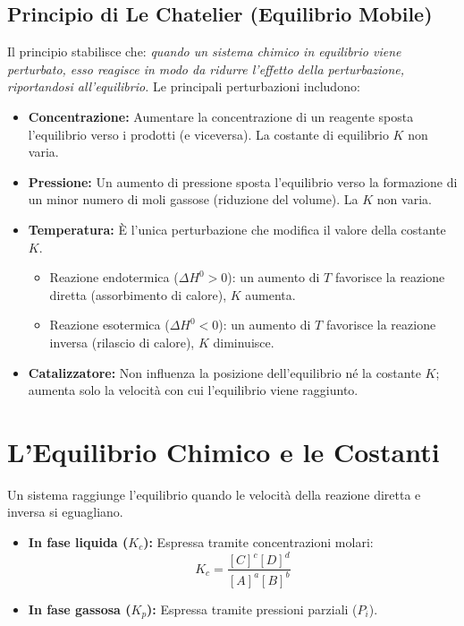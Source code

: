 \documentclass[11pt, a4paper, openright]{book}
\begin{document}
\subsection{Principio di Le Chatelier (Equilibrio Mobile)}
Il principio stabilisce che: \textit{quando un sistema chimico in equilibrio viene perturbato, esso reagisce in modo da ridurre l'effetto della perturbazione, riportandosi all'equilibrio.}
Le principali perturbazioni includono:
\begin{itemize}
    \item \textbf{Concentrazione:} Aumentare la concentrazione di un reagente sposta l'equilibrio verso i prodotti (e viceversa). La costante di equilibrio $K$ non varia.
    \item \textbf{Pressione:} Un aumento di pressione sposta l'equilibrio verso la formazione di un minor numero di moli gassose (riduzione del volume). La $K$ non varia.
    \item \textbf{Temperatura:} È l'unica perturbazione che modifica il valore della costante $K$.
    \begin{itemize}
        \item Reazione endotermica ($\Delta H^0 > 0$): un aumento di $T$ favorisce la reazione diretta (assorbimento di calore), $K$ aumenta.
        \item Reazione esotermica ($\Delta H^0 < 0$): un aumento di $T$ favorisce la reazione inversa (rilascio di calore), $K$ diminuisce.
    \end{itemize}
    \item \textbf{Catalizzatore:} Non influenza la posizione dell'equilibrio né la costante $K$; aumenta solo la velocità con cui l'equilibrio viene raggiunto.
\end{itemize}

\section{L'Equilibrio Chimico e le Costanti}
Un sistema raggiunge l'equilibrio quando le velocità della reazione diretta e inversa si eguagliano.
\begin{itemize}
    \item \textbf{In fase liquida ($K_c$):} Espressa tramite concentrazioni molari:
    \begin{equation}
    K_c = \frac{[C]^c [D]^d}{[A]^a [B]^b}
    \end{equation}
    \item \textbf{In fase gassosa ($K_p$):} Espressa tramite pressioni parziali ($P_i$).
\end{itemize}
\end{document}
